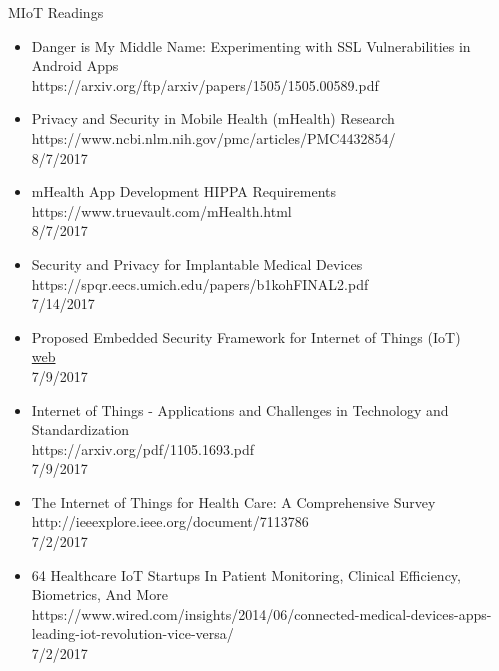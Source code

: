 \documentclass{article}
\begin{document}
\begin{center}
\LARGE MIoT Readings
\end{center}

\begin{itemize}
\item Danger is My Middle Name:
Experimenting with SSL Vulnerabilities in Android Apps
\\ https://arxiv.org/ftp/arxiv/papers/1505/1505.00589.pdf
\item Privacy and Security in Mobile Health (mHealth) Research 
\\ https://www.ncbi.nlm.nih.gov/pmc/articles/PMC4432854/
\\ 8/7/2017

\item mHealth App Development HIPPA Requirements
\\ https://www.truevault.com/mHealth.html
\\ 8/7/2017

\item Security and Privacy for Implantable Medical Devices
\\ https://spqr.eecs.umich.edu/papers/b1kohFINAL2.pdf
\\ 7/14/2017

\item Proposed Embedded Security Framework for Internet of Things (IoT)
\\\href{https://www.researchgate.net/profile/Jaydip_Sen/publication/252013823_Proposed_Embedded_Security_Framework_for_Internet_of_Things_IoT/links/00b495278c92a797d9000000/Proposed-Embedded-Security-Framework-for-Internet-of-Things-IoT.pdf}{web}
\\ 7/9/2017

\item Internet of Things - Applications and Challenges in
Technology and Standardization
\\ https://arxiv.org/pdf/1105.1693.pdf
\\ 7/9/2017

\item The Internet of Things for Health Care: A Comprehensive Survey
\\ http://ieeexplore.ieee.org/document/7113786
\\ 7/2/2017

\item 64 Healthcare IoT Startups In Patient Monitoring, Clinical Efficiency, Biometrics, And More
\\ https://www.wired.com/insights/2014/06/connected-medical-devices-apps-leading-iot-revolution-vice-versa/
\\ 7/2/2017


\end{itemize}
\end{document}

